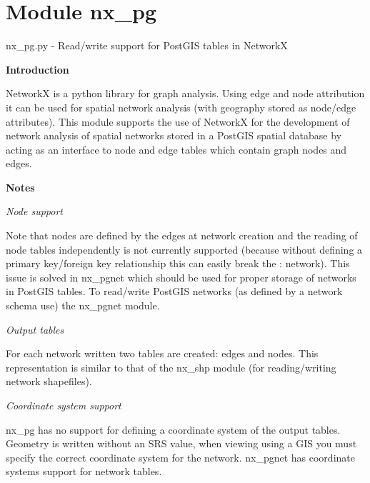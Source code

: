 %
%
%


\section{Module nx\_pg}

    \label{nx_pg}
nx\_pg.py - Read/write support for PostGIS tables in NetworkX

\textbf{Introduction}

NetworkX is a python library for graph analysis. Using edge and node 
attribution it can be used for spatial network analysis (with geography 
stored as node/edge attributes). This module supports the use of NetworkX 
for the development of network analysis of spatial networks stored in a 
PostGIS spatial database by acting as an interface to node and edge tables 
which contain graph nodes and edges.

\textbf{Notes}

\textit{Node support}

Note that nodes are defined by the edges at network creation and the 
reading of node tables independently is not currently supported (because 
without defining a primary key/foreign key relationship this can easily 
break the : network). This issue is solved in nx\_pgnet which should be 
used for proper storage of networks in PostGIS tables. To read/write 
PostGIS networks (as defined by a network schema use) the nx\_pgnet module.

\textit{Output tables}

For each network written two tables are created: edges and nodes. This 
representation is similar to that of the nx\_shp module (for 
reading/writing network shapefiles).

\textit{Coordinate system support}

nx\_pg has no support for defining a coordinate system of the output 
tables. Geometry is written without an SRS value, when viewing using a GIS 
you must specify the correct coordinate system for the network. nx\_pgnet 
has coordinate systems support for network tables.

